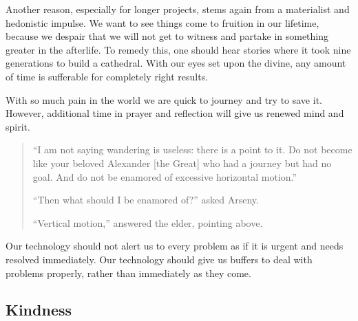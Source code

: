 \documentclass[letterpaper]{article}
\begin{document}
    Another reason, especially for longer projects, stems again from a materialist and hedonistic impulse. We want to see things come to fruition in our lifetime, because we despair that we will not get to witness and partake in something greater in the afterlife. To remedy this, one should hear stories where it took nine generations to build a cathedral. With our eyes set upon the divine, any amount of time is sufferable for completely right results.


    With so much pain in the world we are quick to journey and try to save it. However, additional time in prayer and reflection will give us renewed mind and spirit.

    \begin{quote}
      ``I am not saying wandering is useless: there is a point to it. Do not become like your beloved Alexander [the Great] who had a journey but had no goal. And do not be enamored of excessive horizontal motion.''

      ``Then what should I be enamored of?'' asked Arseny.

      ``Vertical motion,'' answered the elder, pointing above.
    \end{quote}

    Our technology should not alert us to every problem as if it is urgent and needs resolved immediately. Our technology should give us buffers to deal with problems properly, rather than immediately as they come.

  \subsection{Kindness}
\end{document}
